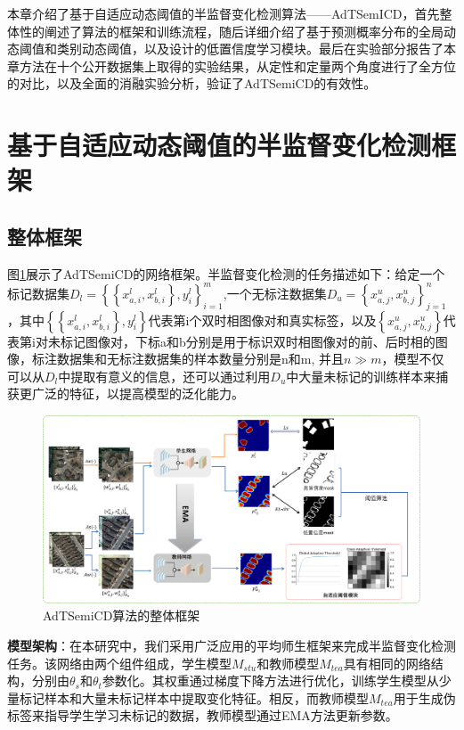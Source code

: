 \documentclass[lang=chs, degree=master, blindreview=false, adobe=false]{yanputhesis}
\begin{document}
本章介绍了基于自适应动态阈值的半监督变化检测算法——AdTSemICD，首先整体性的阐述了算法的框架和训练流程，随后详细介绍了基于预测概率分布的全局动态阈值和类别动态阈值，以及设计的低置信度学习模块。最后在实验部分报告了本章方法在十个公开数据集上取得的实验结果，从定性和定量两个角度进行了全方位的对比，以及全面的消融实验分析，验证了AdTSemiCD的有效性。
\section{基于自适应动态阈值的半监督变化检测框架}
\subsection{整体框架}
图\ref{fig:AdT_frame}展示了AdTSemiCD的网络框架。半监督变化检测的任务描述如下：给定一个标记数据集$D_{l}=\left\{\left\{x_{a, i}^{l}, x_{b, i}^{l}\right\}, y_{i}^{l}\right\}_{i=1}^{m}$,一个无标注数据集$D_{u}=\left\{x_{a, j}^{u}, x_{b, j}^{u}\right\}_{j=1}^{n}$，其中$\left\{\left\{x_{a, i}^{l}, x_{b, i}^{l}\right\}, y_{i}^{l}\right\}$代表第i个双时相图像对和真实标签，以及$\left\{x_{a, j}^{u}, x_{b, j}^{u}\right\}$代表第i对未标记图像对，下标a和b分别是用于标识双时相图像对的前、后时相的图像，标注数据集和无标注数据集的样本数量分别是n和m, 并且$n \gg m$，模型不仅可以从$D_{l}$中提取有意义的信息，还可以通过利用$D_{u}$中大量未标记的训练样本来捕获更广泛的特征，以提高模型的泛化能力。
\begin{figure}[!htbp]
	\centering
	\includegraphics[scale=0.35]{images/AdTFrame.png}
	\caption{
		AdTSemiCD算法的整体框架
	}
	\label{fig:AdT_frame}
\end{figure}

\textbf{模型架构}：在本研究中，我们采用广泛应用的平均师生框架来完成半监督变化检测任务。该网络由两个组件组成，学生模型$M_{stu}$和教师模型$M_{tea}$具有相同的网络结构，分别由$\theta_s$和$\theta_t$参数化。其权重通过梯度下降方法进行优化，训练学生模型从少量标记样本和大量未标记样本中提取变化特征。相反，而教师模型$M_{tea}$用于生成伪标签来指导学生学习未标记的数据，教师模型通过EMA方法更新参数。
\end{document}
